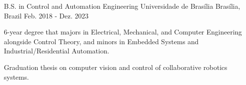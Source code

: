 

\begin{cventries}

  \cventry
    {B.S. in Control and Automation Engineering} %
    {Universidade de Brasília} %
    {Brasília, Brazil} %
    {Feb. 2018 - Dez. 2023} %
    {
      \begin{cvitems} %
        \item {6-year degree that majors in Electrical, Mechanical, and Computer Engineering alongside Control Theory, and minors in Embedded Systems and Industrial/Residential Automation.}
        \item {Graduation thesis on computer vision and control of collaborative robotics systems.}
      \end{cvitems}
    }

\end{cventries}
